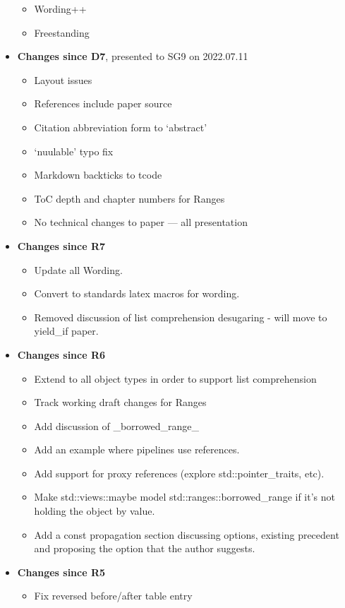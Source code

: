 \documentclass[a4paper,10pt,oneside,openany,final,article]{memoir}
\begin{document}
\begin{itemize}
\begin{itemize}
  \item Wording++
  \item Freestanding
  \end{itemize}
\item \textbf{Changes since D7}, presented to SG9 on 2022.07.11
  \begin{itemize}
  \item Layout issues
  \item References include paper source
  \item Citation abbreviation form to `abstract'
  \item `nuulable' typo fix
  \item Markdown backticks to tcode
  \item ToC depth and chapter numbers for Ranges
  \item No technical changes to paper --- all presentation
  \end{itemize}
\item \textbf{Changes since R7}
  \begin{itemize}
  \item Update all Wording.
  \item Convert to standards latex macros for wording.
  \item Removed discussion of list comprehension desugaring - will move to yield_if paper.
  \end{itemize}
\item \textbf{Changes since R6}
  \begin{itemize}
  \item Extend to all object types in order to support list comprehension
  \item Track working draft changes for Ranges
  \item Add discussion of _borrowed_range_
  \item Add an example where pipelines use references.
  \item Add support for proxy references (explore std::pointer_traits, etc).
  \item Make std::views::maybe model std::ranges::borrowed_range if it's not holding the object by value.
  \item Add a const propagation section discussing options, existing precedent and proposing the option that the author suggests.
  \end{itemize}
\item \textbf{Changes since R5}
  \begin{itemize}
  \item Fix reversed before/after table entry

\end{itemize}
\end{itemize}
\end{document}
